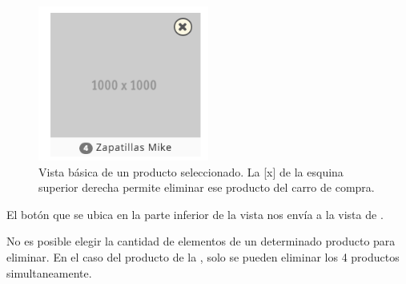 		\begin{figure}[H]
			\centering
			\includegraphics[width=0.5\textwidth]{figuras/solution/cart/producto.png}
			\caption{Vista básica de un producto seleccionado. La [x] de la esquina superior derecha permite eliminar ese producto del carro de compra.}
			\label{figure:solution:cart:product}
		\end{figure}

		El botón \checkoutNowLABEL que se ubica en la parte inferior de la vista  nos envía a la vista de .

		No es posible elegir la cantidad de elementos de un determinado producto para eliminar. En el caso del producto de la , solo se pueden eliminar los 4 productos simultaneamente.


